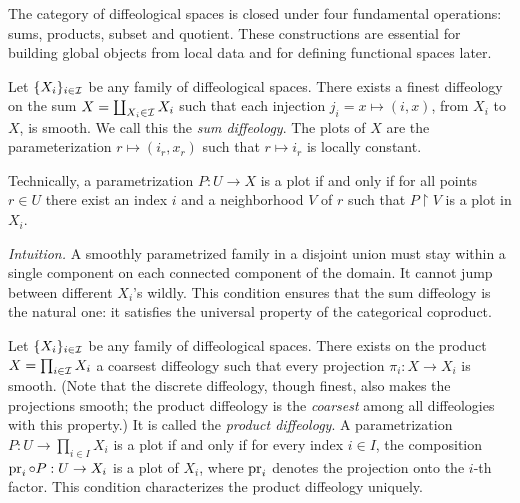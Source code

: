   The category of diffeological spaces is closed under four fundamental operations:
  sums,
  products, subset and quotient.
  These constructions are essential for building global objects from
  local data and for defining functional spaces later.
  
  \begin{article}
    \label{subsec:sums}
    Let $\{X_i\}_{i \in \mathcal{I}}$ be any family of diffeological spaces.
    There exists a finest diffeology on the sum $X = \coprod_{X_i \in \mathcal{I}} X_i$ such that each injection $j_i = x \mapsto (i,x)$,
    from $X_i$ to $X$,
    is smooth.
    We call this the \emph{sum diffeology}.
    The plots of $X$ are the parameterization $r \mapsto (i_r,x_r)$ such that $r \mapsto i_r$ is locally constant.
    
    Technically,
    a parametrization $P : U \to X$ is a plot if and only if for all points $r \in U$ there exist an index $i$ and a neighborhood $V$ of $r$ such that $P \restriction V$ is a plot in $X_i$.
    
    \noindent
    \textit{Intuition.} A smoothly parametrized family in a disjoint union
    must stay within a single component on each connected component of the domain.
    It cannot jump between different $X_i$'s wildly.
    This condition ensures that the sum diffeology is the natural one:
    it satisfies the universal property of the categorical coproduct.
  \end{article}
  
  \begin{article}
    \label{subsec:product}
    Let $\{X_i\}_{i \in \mathcal{I}}$ be any family of diffeological spaces.
    There exists on the product $X = \prod_{i \in \mathcal{I}} X_i$ a coarsest diffeology such that every projection $\pi_i \colon X \to X_i$ is smooth.
    (Note that the discrete diffeology,
    though finest,
    also makes the projections smooth;
    the product diffeology is the \emph{coarsest} among all diffeologies with this property.)
    It is called the \emph{product diffeology}.
    A parametrization $P: U \to \prod_{i\in I} X_i$ is a plot if and only if
    for every index $i\in I$, the composition
    $\pr_i \circ P : U \to X_i$ is a plot of $X_i$,
    where $\pr_i$ denotes the projection onto the $i$-th factor.
    This condition characterizes the product diffeology uniquely.
  \end{article}
  
